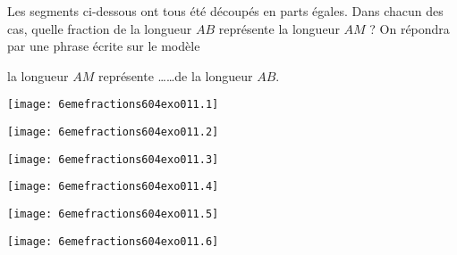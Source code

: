 Les segments ci-dessous ont tous été découpés en parts égales. Dans chacun des cas, quelle fraction de la longueur $AB$ représente la longueur $AM$ ? On répondra par une phrase écrite sur le modèle
\begin{center}
{\cursive la longueur $AM$ représente \ldots\ldots de la longueur $AB$.}
\end{center}
\begin{myenumerate}
\setlength{\baselineskip}{4\baselineskip}
  \begin{multicols}{2}
  \item\texttt{[image: 6emefractions604exo011.1]}
  \item\texttt{[image: 6emefractions604exo011.2]}
  \item\texttt{[image: 6emefractions604exo011.3]}
  \item\texttt{[image: 6emefractions604exo011.4]}
  \item\texttt{[image: 6emefractions604exo011.5]}
  \item\texttt{[image: 6emefractions604exo011.6]}    
  \end{multicols}
\end{myenumerate}

